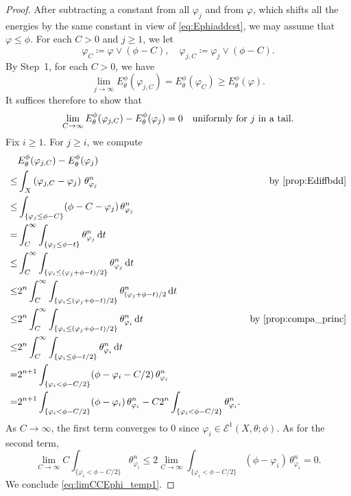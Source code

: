 \begin{proof}
    After subtracting a constant from all $\varphi_j$ and from $\varphi$, which shifts all the energies by the same constant in view of \eqref{eq:Ephiaddcst}, we may assume that $\varphi\leq \phi$. For each $C>0$ and $j\geq 1$, we let
    \[
    \varphi_C\coloneqq \varphi\lor (\phi-C),\quad \varphi_{j,C}\coloneqq \varphi_j\lor (\phi-C).
    \]
    By Step~1, for each $C>0$, we have
    \[
    \lim_{j\to\infty} E_{\theta}^{\phi}(\varphi_{j,C})= E_{\theta}^{\phi}(\varphi_{C})\geq E_{\theta}^{\phi}(\varphi).
    \]
    It suffices therefore to show that
    \begin{equation}\label{eq:limCCEphi_temp1}
    \lim_{C\to \infty} E_{\theta}^{\phi}(\varphi_{j,C})-E_{\theta}^{\phi}(\varphi_{j})=0\quad \textup{uniformly for $j$ in a tail}.
    \end{equation}
    Fix $i\geq 1$.
    For $j\geq i$, we compute
    \[
    \begin{aligned}
        & E_{\theta}^{\phi}(\varphi_{j,C})-E_{\theta}^{\phi}(\varphi_{j})\\
        \leq & \int_X \left( \varphi_{j,C}-\varphi_{j}\right)\,\theta_{\varphi_{j}}^n &\textup{by \cref{prop:Ediffbdd}}\\
        \leq & \int_{\{\varphi_j\leq \phi-C\}} (\phi-C-\varphi_j)\,\theta_{\varphi_j}^n\\
        =& \int_C^{\infty}\int_{\{\varphi_j\leq \phi-t\}} \theta_{\varphi_j}^n\,\mathrm{d}t\\
        \leq & \int_C^{\infty}\int_{\{\varphi_i\leq (\varphi_j+\phi-t)/2\}} \theta_{\varphi_j}^n\,\mathrm{d}t\\
        \leq & 2^n\int_C^{\infty}\int_{\{\varphi_i\leq (\varphi_j+\phi-t)/2\}} \theta_{(\varphi_j+\phi-t)/2}^n\,\mathrm{d}t\\
        \leq & 2^n\int_C^{\infty}\int_{\{\varphi_i\leq (\varphi_j+\phi-t)/2\}} \theta_{\varphi_i}^n\,\mathrm{d}t & \textup{by \cref{prop:compa_princ}}\\
        \leq &2^n\int_C^{\infty}\int_{\{\varphi_i\leq \phi-t/2\}} \theta_{\varphi_i}^n\,\mathrm{d}t\\
        = & 2^{n+1}\int_{\{\varphi_i< \phi-C/2\}} (\phi-\varphi_i-C/2)\,\theta_{\varphi_i}^n\\
        = & 2^{n+1}\int_{\{\varphi_i< \phi-C/2\}} (\phi-\varphi_i)\,\theta_{\varphi_i}^n-C 2^n\int_{\{\varphi_i< \phi-C/2\}}\theta_{\varphi_i}^n.
    \end{aligned}
    \]
    As $C\to \infty$, the first term converges to $0$ since $\varphi_i\in \mathcal{E}^1(X,\theta;\phi)$. As for the second term,
    \[
    \lim_{C\to\infty}C\int_{\{\varphi_i< \phi-C/2 \}} \theta_{\varphi_i}^n\leq 2 \lim_{C\to\infty}\int_{\{\varphi_i< \phi-C/2 \}}(\phi-\varphi_i)\, \theta_{\varphi_i}^n = 0.
    \]
    We conclude \eqref{eq:limCCEphi_temp1}.


\end{proof}
